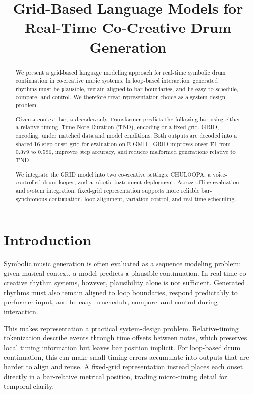 \documentclass{article}
\title{Grid-Based Language Models for Real-Time Co-Creative Drum Generation}
\begin{document}
\maketitle

\begin{abstract}
We present a grid-based language modeling approach for real-time symbolic drum continuation in co-creative music systems. In loop-based interaction, generated rhythms must be plausible, remain aligned to bar boundaries, and be easy to schedule, compare, and control. We therefore treat representation choice as a system-design problem.

Given a context bar, a decoder-only Transformer predicts the following bar using either a relative-timing, Time-Note-Duration (TND), encoding or a fixed-grid, GRID, encoding, under matched data and model conditions. Both outputs are decoded into a shared 16-step onset grid for evaluation on E-GMD \cite{callender2020improving}. GRID improves onset F1 from 0.379 to 0.586, improves step accuracy, and reduces malformed generations relative to TND.

We integrate the GRID model into two co-creative settings: CHULOOPA, a voice-controlled drum looper, and a robotic instrument deployment. Across offline evaluation and system integration, fixed-grid representation supports more reliable bar-synchronous continuation, loop alignment, variation control, and real-time scheduling.
\end{abstract}

\section{Introduction}\label{sec:introduction}
Symbolic music generation is often evaluated as a sequence modeling problem: given musical context, a model predicts a plausible continuation. In real-time co-creative rhythm systems, however, plausibility alone is not sufficient. Generated rhythms must also remain aligned to loop boundaries, respond predictably to performer input, and be easy to schedule, compare, and control during interaction.

This makes representation a practical system-design problem. Relative-timing tokenization \cite{huang2018music} describe events through time offsets between notes, which preserves local timing information but leaves bar position implicit. For loop-based drum continuation, this can make small timing errors accumulate into outputs that are harder to align and reuse. A fixed-grid representation instead places each onset directly in a bar-relative metrical position, trading micro-timing detail for temporal clarity.
\end{document}
